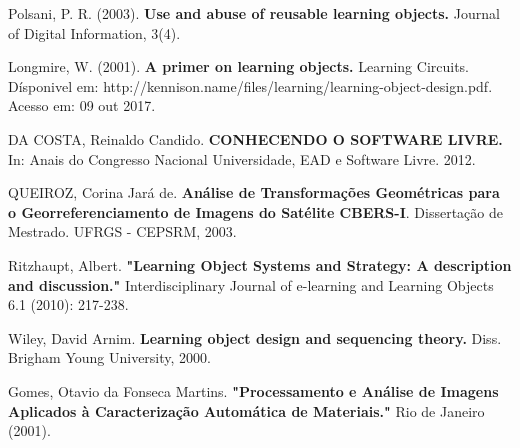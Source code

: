 \documentclass[12pt,openright,oneside,a4paper,english,french,spanish,brazil]{unifil}
\begin{document}
\begin{thebibliography}{99}
{Polsani, P. R. (2003). \textbf{Use and abuse of reusable learning objects.} Journal of Digital Information, 3(4).}

{Longmire, W. (2001). \textbf{A primer on learning objects.} Learning Circuits. Dísponivel em: http://kennison.name/files/learning/learning-object-design.pdf. Acesso em: 09 out 2017.}

{DA COSTA, Reinaldo Candido. \textbf{CONHECENDO O SOFTWARE LIVRE.} In: Anais do Congresso Nacional Universidade, EAD e Software Livre. 2012.}

{QUEIROZ, Corina Jará de. \textbf{Análise de Transformações Geométricas para o Georreferenciamento de Imagens do Satélite CBERS-I}. Dissertação de Mestrado. UFRGS - CEPSRM, 2003.}

{Ritzhaupt, Albert. \textbf{"Learning Object Systems and Strategy: A description and discussion."} Interdisciplinary Journal of e-learning and Learning Objects 6.1 (2010): 217-238.}

{Wiley, David Arnim. \textbf{Learning object design and sequencing theory.} Diss. Brigham Young University, 2000.}

{Gomes, Otavio da Fonseca Martins. \textbf{"Processamento e Análise de Imagens Aplicados à Caracterização Automática de Materiais."} Rio de Janeiro (2001).}

\bibitem{}

{}

\end{thebibliography}
\end{document}
